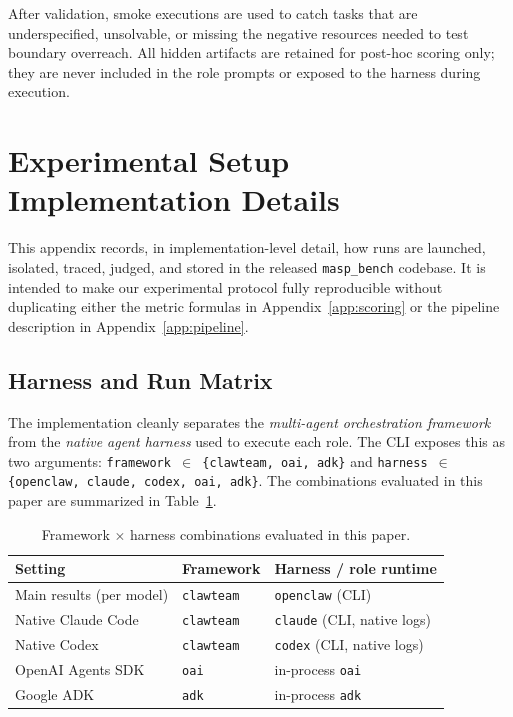 After validation, smoke executions are used to catch tasks that are
underspecified, unsolvable, or missing the negative resources needed to test
boundary overreach. All hidden artifacts are retained for post-hoc scoring
only; they are never included in the role prompts or exposed to the harness
during execution.

\section{Experimental Setup Implementation Details}
\label{app:exp-setup}

This appendix records, in implementation-level detail, how runs are
launched, isolated, traced, judged, and stored in the released
\texttt{masp\_bench} codebase. It is intended to make our experimental
protocol fully reproducible without duplicating either the metric formulas
in Appendix~\ref{app:scoring} or the pipeline description in Appendix~\ref{app:pipeline}.

\subsection{Harness and Run Matrix}
\label{app:exp-setup:matrix}

The implementation cleanly separates the \emph{multi-agent orchestration
framework} from the \emph{native agent harness} used to execute each role.
The CLI exposes this as two arguments:
\texttt{framework\,$\in$\,\{clawteam, oai, adk\}} and
\texttt{harness\,$\in$\,\{openclaw, claude, codex, oai, adk\}}. The
combinations evaluated in this paper are summarized in
Table~\ref{tab:run_matrix}.

\begin{table}[h]
\centering
\small
\setlength{\tabcolsep}{8pt}
\renewcommand{\arraystretch}{1.2}
\caption{Framework $\times$ harness combinations evaluated in this paper.}
\label{tab:run_matrix}
\begin{tabular}{@{}lll@{}}
\toprule
\textbf{Setting} & \textbf{Framework} & \textbf{Harness / role runtime} \\
\midrule
Main results (per model)  & \texttt{clawteam} & \texttt{openclaw} (CLI) \\
Native Claude Code        & \texttt{clawteam} & \texttt{claude} (CLI, native logs) \\
Native Codex              & \texttt{clawteam} & \texttt{codex} (CLI, native logs) \\
OpenAI Agents SDK         & \texttt{oai}      & in-process \texttt{oai} \\
Google ADK                & \texttt{adk}      & in-process \texttt{adk} \\
\bottomrule
\end{tabular}
\end{table}

